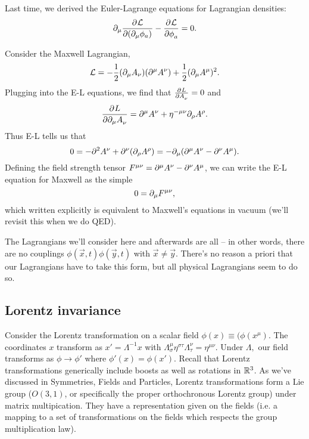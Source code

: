 Last time, we derived the Euler-Lagrange equations for Lagrangian densities:
\begin{equation}
\p_\mu \P{\mathcal{L}}{(\p_\mu \phi_a)}-\P{\mathcal{L}}{\phi_a}=0.
\end{equation}

\begin{exm}
Consider the Maxwell Lagrangian,
\begin{equation}
\mathcal{L}=-\frac{1}{2}(\p_\mu A_\nu)(\p^\mu A^\nu)+\frac{1}{2}(\p_\mu A^\mu)^2.
\end{equation}
Plugging into the E-L equations, we find that $\P{L}{A_\nu}=0$ and
\begin{equation}
\P{L}{\p_\mu A_\nu}=\p^\mu A^\nu +\eta^{-\mu\nu}\p_\rho A^\rho.
\end{equation}
Thus E-L tells us that
\begin{equation}
0=-\p^2 A^\nu+\p^\nu (\p_\rho A^\rho)=-\p_\mu(\p^\mu A^\nu-\p^\nu A^\mu).
\end{equation}
Defining the field strength tensor $F^{\mu\nu}=\p^\mu A^\nu-\p^\nu A^\mu$, we can write the E-L equation for Maxwell as the simple
$$0=\p_\mu F^{\mu\nu},$$
which written explicitly is equivalent to Maxwell's equations in vacuum (we'll revisit this when we do QED).
\end{exm}

The Lagrangians we'll consider here and afterwards are all -- in other words, there are no couplings $\phi(\vec{x},t)\phi(\vec{y},t)$ with $\vec{x}\neq \vec{y}$. There's no reason a priori that our Lagrangians have to take this form, but all physical Lagrangians seem to do so.

\subsection*{Lorentz invariance} Consider the Lorentz transformation on a scalar field $\phi(x)\equiv (\phi (x^\mu)$. The coordinates $x$ transform as $x'=\Lambda^{-1} x$ with $\Lambda^\mu_\sigma \eta^{\sigma\tau}\Lambda_\tau^\nu = \eta^{\mu\nu}$. Under $\Lambda,$ our field transforms as $\phi\to \phi'$ where $\phi'(x)=\phi(x')$. Recall that Lorentz transformations generically include boosts as well as rotations in $\RR^3$. As we've discussed in Symmetries, Fields and Particles, Lorentz transformations form a Lie group ($O(3,1)$, or specifically the proper orthochronous Lorentz group) under matrix multipication. They have a representation given on the fields (i.e. a mapping to a set of transformations on the fields which respects the group multiplication law).

